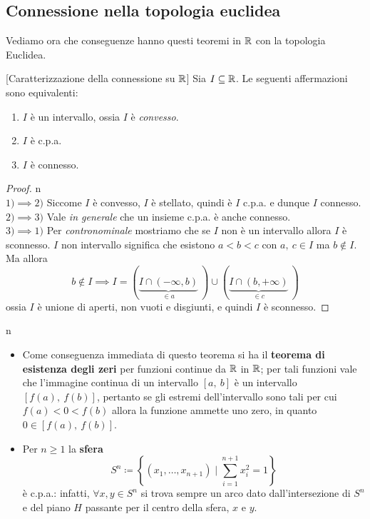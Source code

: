\subsection{Connessione nella topologia euclidea}
Vediamo ora che conseguenze hanno questi teoremi in $\mathbb{R}$ con la topologia Euclidea.
\begin{theorem}{}[Caratterizzazione della connessione su $\mathbb{R}$]
	Sia $I\subseteq \mathbb{R}$. Le seguenti affermazioni sono equivalenti:
		\begin{enumerate}
	\item $I$ è un intervallo, ossia $I$ è \textit{convesso}.
	\item $I$ è c.p.a.
	\item $I$ è connesso.
		\end{enumerate}
\end{theorem}
\begin{proof}{n}~{}\\
	$1) \implies 2)$ Siccome $I$ è convesso, $I$ è stellato, quindi è $I$ c.p.a. e dunque $I$ connesso. \\
	$2) \implies 3)$ Vale \textit{in generale} che un insieme c.p.a. è anche connesso.\\
	$3) \implies 1)$ Per \textit{contronominale} mostriamo che se $I$ non è un intervallo allora $I$ è sconnesso. $I$ non intervallo significa che esistono $a<b<c$ con $a,\ c\in I$ ma $b\notin I$. Ma allora
		\begin{equation*}
			b\notin I \implies I= \left(\underbrace{ I\cap \left(-\infty ,b\right)}_{\in a}\ \right) \cup \left( \underbrace{I\cap \left(b ,+\infty\right)}_{\in c}\ \right)
		\end{equation*}
	ossia $I$ è unione di aperti, non vuoti e disgiunti, e quindi $I$ è sconnesso.\qedhere
\end{proof}
\begin{remark}{n}~{}\label{teorema esistenza zeri funzioni continue, s^n cpa}
	\begin{itemize}
	\item Come conseguenza immediata di questo teorema si ha il \textbf{teorema di esistenza degli zeri} per funzioni continue da $\mathbb{R}$ in $\mathbb{R}$; per tali funzioni vale che l'immagine continua di un intervallo $\left[a,\ b\right]$ è un intervallo $\left[f\left(a\right),\ f\left(b\right)\right]$, pertanto se gli estremi dell'intervallo sono tali per cui $f\left(a\right)<0<f\left(b\right)$ allora la funzione ammette uno zero, in quanto $0\in\left[f\left(a\right),\ f\left(b\right)\right]$.
	\item Per $n\geq 1$ la \textbf{sfera}
	\begin{equation*}
		 S^n \coloneqq \left\{ \left(x_1,\ldots,x_{n+1}\right) \mid \sum_{i=1}^{n+1}x_i^2=1 \right\}
	\end{equation*}
	è c.p.a.: infatti, $\forall x,y\in S^n$ si trova sempre un arco dato dall'intersezione di $S^n$ e del piano $H$ passante per il centro della sfera, $x$ e $y$.
		\end{itemize}
\end{remark}
